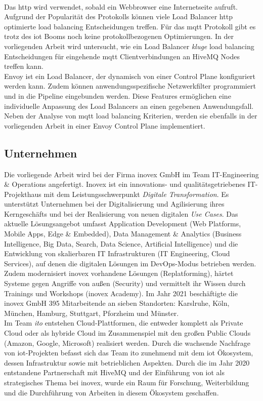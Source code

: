 \\
Das \ac{http} wird verwendet, sobald ein Webbrowser eine Internetseite aufruft. Aufgrund der Popularität des Protokolls können viele Load Balancer \ac{http} optimierte load balancing Entscheidungen treffen.
Für das \ac{mqtt} Protokoll gibt es trotz des \acl{iot} Booms noch keine protokollbezogenen Optimierungen.
In der vorliegenden Arbeit wird untersucht, wie ein Load Balancer \textit{kluge} load balancing Entscheidungen für eingehende \ac{mqtt} Clientverbindungen an HiveMQ Nodes treffen kann.
\\
Envoy ist ein Load Balancer, der dynamisch von einer Control Plane konfiguriert werden kann.
Zudem können anwendungsspezifische Netzwerkfilter programmiert und in die Pipeline eingebunden werden.
Diese Features ermöglichen eine individuelle Anpassung des Load Balancers an einen gegebenen Anwendungsfall.
Neben der Analyse von \ac{mqtt} load balancing Kriterien, werden sie ebenfalls in der vorliegenden Arbeit in einer Envoy Control Plane implementiert.

\subsection{Unternehmen}
Die vorliegende Arbeit wird bei der Firma inovex GmbH im Team IT-Engineering \& Operations angefertigt.
Inovex ist ein innovations- und qualitätsgetriebenes IT-Projekthaus mit dem Leistungsschwerpunkt \textit{Digitale Transformation}.
Es unterstützt Unternehmen bei der Digitalisierung und Agilisierung ihres Kerngeschäfts und bei der Realisierung von neuen digitalen \textit{Use Cases}.
Das aktuelle Lösungsangebot umfasst Application Development (Web Platforms, Mobile Apps, Edge \& Embedded), Data Management \& Analytics (Business Intelligence, Big Data, Search, Data Science, Artificial Intelligence) und die Entwicklung von skalierbaren IT Infrastrukturen (IT Engineering, Cloud Services), auf denen die digitalen Lösungen im DevOps-Modus betrieben werden.
Zudem modernisiert inovex vorhandene Lösungen (Replatforming), härtet Systeme gegen Angriffe von au{\ss}en (Security) und vermittelt ihr Wissen durch Trainings und Workshops (inovex Academy).
Im Jahr 2021 beschäftigte die inovex GmbH 395 Mitarbeitende an sieben Standorten: Karslruhe, Köln, München, Hamburg, Stuttgart, Pforzheim und Münster.
\\
Im Team \textit{\ac{ito}} entstehen Cloud-Plattformen, die entweder komplett als Private Cloud oder als hybride Cloud im Zusammenspiel mit den gro{\ss}en Public Clouds (Amazon, Google, Microsoft) realisiert werden.
Durch die wachsende Nachfrage von \acs{iot}-Projekten befasst sich das Team \ac{ito} zunehmend mit dem \acl{iot} Ökosystem, dessen Infrastruktur sowie mit betrieblichen Aspekten.
Durch die im Jahr 2020 entstandene Partnerschaft mit HiveMQ und der Einführung von \ac{iot} als strategisches Thema bei inovex, wurde ein Raum für Forschung, Weiterbildung und die Durchführung von Arbeiten in diesem Ökosystem geschaffen.

